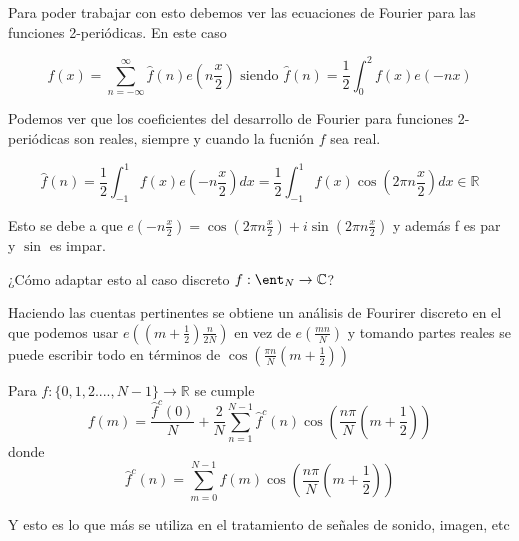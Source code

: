 	Para poder trabajar con esto debemos ver las ecuaciones de Fourier para las funciones 2-periódicas. En este caso

	$$f(x) = \sum_{n=-\infty}^{\infty} \widehat{f}(n)e(n\frac{x}{2}) \text{ siendo }\widehat{f}(n) = \frac{1}{2} \int_{0}^{2} f(x) e(-nx)$$

	Podemos ver que los coeficientes del desarrollo de Fourier para funciones 2-periódicas son reales, siempre y cuando la fucnión $f$ sea real.

	$$\widehat{f}(n) = \frac{1}{2} \int_{-1}^{1} f(x) e(-n\frac{x}{2}) dx = \frac{1}{2} \int_{-1}^{1} f(x)\cos(2\pi n \frac{x}{2})dx \in \mathbb{R}$$

	Esto se debe a que $e(-n\frac{x}{2}) = \cos(2\pi n \frac{x}{2}) + i \sin(2\pi n \frac{x}{2})$ y además f es par y $\sin$ es impar.

	¿Cómo adaptar esto al caso discreto $f: \ent_N \rightarrow \mathbb{C}$?

	\begin{center}
		\centering
	\end{center}

	Haciendo las cuentas pertinentes se obtiene un análisis de Fourirer discreto en el que podemos usar $e((m + \frac{1}{2}) \frac{n}{2N})$ en vez de $e(\frac{mn}{N})$ y tomando partes reales se puede escribir todo en términos de $\cos(\frac{\pi n}{N}(m+ \frac{1}{2}))$

	\begin{prop}
		Para $f : \{0,1,2....,N-1\} \rightarrow \mathbb{R}$ se cumple
		$$f(m) = \frac{\widehat{f}^c(0)}{N} + \frac{2}{N} \sum_{n=1}^{N-1} \widehat{f}^c(n) \cos\left(\frac{n\pi}{N}\left(m + \frac{1}{2}\right)\right)$$
		donde
		$$\widehat{f}^c(n)= \sum_{m= 0}^{N-1} f(m) \cos\left(\frac{n\pi}{N}\left(m+ \frac{1}{2}\right)\right)$$
	\end{prop}
	\begin{obs} Y esto es lo que más se utiliza en el tratamiento de señales de sonido, imagen, etc
	\end{obs}

